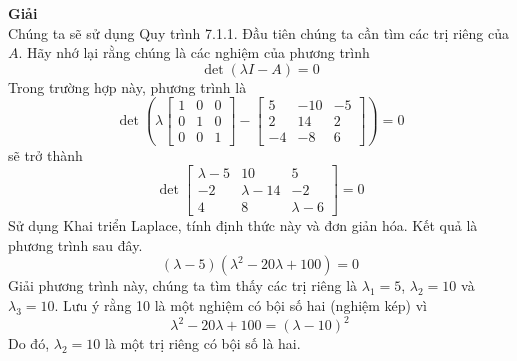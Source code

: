 \textbf{Giải} \\
Chúng ta sẽ sử dụng Quy trình 7.1.1. Đầu tiên chúng ta cần tìm các trị riêng của $A$. Hãy nhớ lại rằng chúng là các nghiệm của phương trình
\begin{equation*}
\det(\lambda I-A)=0
\end{equation*}
Trong trường hợp này, phương trình là
\begin{equation*}
\det\left(\lambda\begin{bmatrix}1&0&0\\ 0&1&0\\ 0&0&1\end{bmatrix}-\begin{bmatrix}5&-10&-5\\ 2&14&2\\ -4&-8&6\end{bmatrix}\right)=0
\end{equation*}
sẽ trở thành
\begin{equation*}
\det\begin{bmatrix}\lambda-5&10&5\\ -2&\lambda-14&-2\\ 4&8&\lambda-6\end{bmatrix}=0
\end{equation*}
Sử dụng Khai triển Laplace, tính định thức này và đơn giản hóa. Kết quả là phương trình sau đây.
\begin{equation*}
(\lambda-5)(\lambda^{2}-20\lambda+100)=0
\end{equation*}
Giải phương trình này, chúng ta tìm thấy các trị riêng là $\lambda_{1}=5$, $\lambda_{2}=10$ và $\lambda_{3}=10$. Lưu ý rằng 10 là một nghiệm có bội số hai (nghiệm kép) vì
\begin{equation*}
\lambda^{2}-20\lambda+100=(\lambda-10)^{2}
\end{equation*}
Do đó, $\lambda_{2}=10$ là một trị riêng có bội số là hai.

